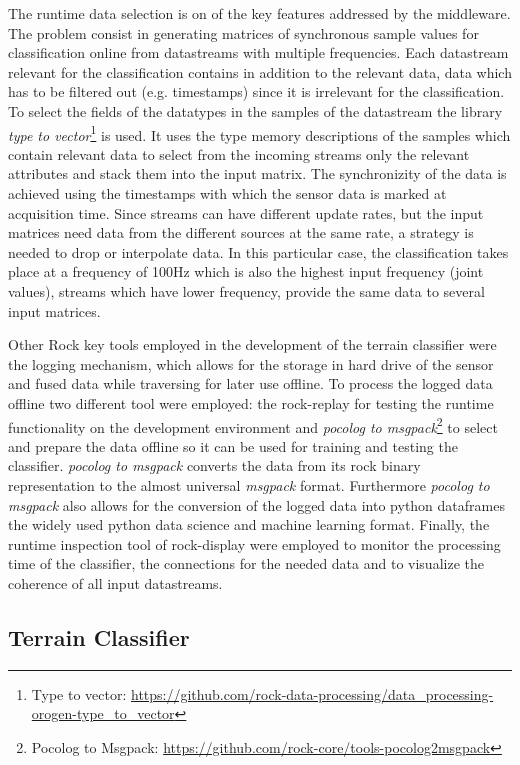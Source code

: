 \documentclass{article}
\begin{document}
The runtime data selection is on of the key features addressed by the middleware. 
The problem consist in generating matrices of synchronous sample values for classification online from datastreams with multiple frequencies.
Each datastream relevant for the classification contains in addition to the relevant data, data which has to be filtered out (e.g. timestamps) since it is irrelevant for the classification.
To select the fields of the datatypes in the samples of the datastream the library \emph{type to vector}\footnote{Type to vector: \url{https://github.com/rock-data-processing/data_processing-orogen-type_to_vector}} is used.
It uses the type memory descriptions of the samples which contain relevant data to select from the incoming streams only the relevant attributes and stack them into the input matrix. 
The synchronizity of the data is achieved using the timestamps with which the sensor data is marked at acquisition time.
Since streams can have different update rates, but the input matrices need data from the different sources at the same rate, a strategy is needed to drop or interpolate data. 
In this particular case, the classification takes place at a frequency of 100Hz which is also the highest input frequency (joint values), streams which have lower frequency, provide the same data to several input matrices.

Other Rock key tools employed in the development of the terrain classifier were the logging mechanism, which allows for the storage in hard drive of the sensor and fused data while traversing for later use offline. 
To process the logged data offline two different tool were employed: the rock-replay for testing the runtime functionality on the development environment and \emph{pocolog to msgpack}\footnote{Pocolog to Msgpack: \url{https://github.com/rock-core/tools-pocolog2msgpack}} to select and prepare the data offline so it can be used for training and testing the classifier.
\emph{pocolog to msgpack} converts the data from its rock binary representation to the almost universal \emph{msgpack} format.
Furthermore \emph{pocolog to msgpack} also allows for the conversion of the logged data into python dataframes the widely used python data science and machine learning format. 
Finally, the runtime inspection tool of rock-display were employed to monitor the processing time of the classifier, the connections for the needed data and to visualize the coherence of all input datastreams. 


\subsection{Terrain Classifier}
\end{document}
